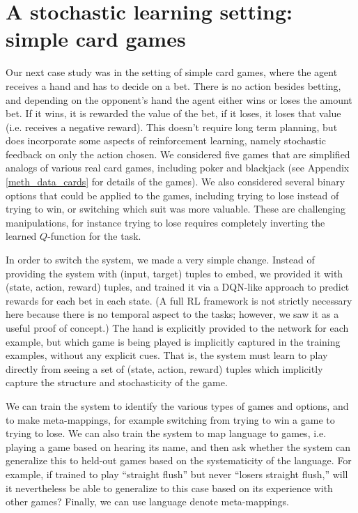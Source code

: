\documentclass{article}
\begin{document}
\section{A stochastic learning setting: simple card games}
Our next case study was in the setting of simple card games, where the agent receives a hand and has to decide on a bet. There is no action besides betting, and depending on the opponent's hand the agent either wins or loses the amount bet. If it wins, it is rewarded the value of the bet, if it loses, it loses that value (i.e. receives a negative reward). This doesn't require long term planning, but does incorporate some aspects of reinforcement learning, namely stochastic feedback on only the action chosen. We considered five games that are simplified analogs of various real card games, including poker and blackjack (see Appendix \ref{meth_data_cards} for details of the games). We also considered several binary options that could be applied to the games, including trying to lose instead of trying to win, or switching which suit was more valuable. These are challenging manipulations, for instance trying to lose requires completely inverting the learned $Q$-function for the task. \par
In order to switch the system, we made a very simple change. Instead of providing the system with (input, target) tuples to embed, we provided it with (state, action, reward) tuples, and trained it via a DQN-like approach \citep{Mnih2015} to predict rewards for each bet in each state. (A full RL framework is not strictly necessary here because there is no temporal aspect to the tasks; however, we saw it as a useful proof of concept.) The hand is explicitly provided to the network for each example, but which game is being played is implicitly captured in the training examples, without any explicit cues. That is, the system must learn to play directly from seeing a set of (state, action, reward) tuples which implicitly capture the structure and stochasticity of the game. \par   
We can train the system to identify the various types of games and options, and to make meta-mappings, for example switching from trying to win a game to trying to lose. We can also train the system to map language to games, i.e. playing a game based on hearing its name, and then ask whether the system can generalize this to held-out games based on the systematicity of the language. For example, if trained to play ``straight flush'' but never ``losers straight flush,'' will it nevertheless be able to generalize to this case based on its experience with other games? Finally, we can use language denote meta-mappings. \par
\end{document}
